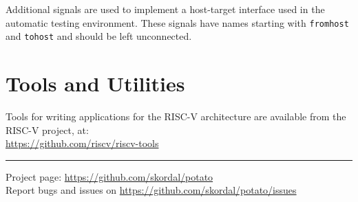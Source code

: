 \documentclass[10pt,a4paper]{article}
\begin{document}
\begin{minipage}[t]{0.48\textwidth}
Additional signals are used to implement a host-target interface used in the automatic testing
environment. These signals have names starting with \texttt{fromhost} and \texttt{tohost} and
should be left unconnected.\\

\section{Tools and Utilities}

Tools for writing applications for the RISC-V architecture are available from the
RISC-V project, at:\\[1em]
\url{https://github.com/riscv/riscv-tools}\\

\end{minipage}

\vfill
\noindent\rule{\linewidth}{1pt}
{\small
Project page: \url{https://github.com/skordal/potato}\\
Report bugs and issues on \url{https://github.com/skordal/potato/issues}}
\end{document}
